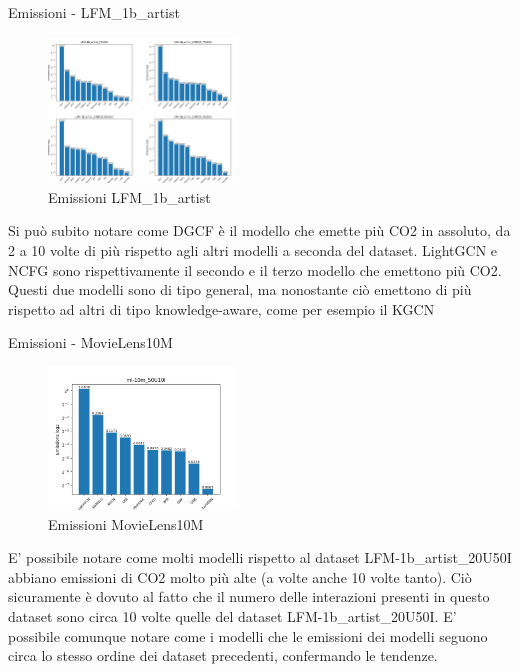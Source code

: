 \begin{frame}{Emissioni - LFM\_1b\_artist}
        \begin{figure}
        \centering
        \includegraphics[width=0.45\textwidth]{images/EmissioniLFM.png}
        \caption{Emissioni LFM\_1b\_artist}
    \end{figure}
    \small
    Si può subito notare come DGCF è il modello che emette più CO2 in assoluto, da 2 a 10 volte di più rispetto agli altri modelli a seconda del dataset.
    LightGCN e NCFG sono rispettivamente il secondo e il terzo modello che emettono più CO2.
    Questi due modelli sono di tipo general, ma nonostante ciò emettono di più rispetto ad altri di tipo knowledge-aware, come per esempio il KGCN
\end{frame}

\begin{frame}{Emissioni - MovieLens10M}
    \begin{figure}
    \centering
    \includegraphics[width=0.45\textwidth]{images/emissions_ml-10m_50U10I.png}
    \caption{Emissioni MovieLens10M}
\end{figure}
\small
E' possibile notare come molti modelli rispetto al dataset LFM-1b\_artist\_20U50I abbiano emissioni di CO2 molto più alte (a volte anche 10 volte tanto).
Ciò sicuramente è dovuto al fatto che il numero delle interazioni presenti in questo dataset sono circa 10 volte quelle del dataset LFM-1b\_artist\_20U50I.
E' possibile comunque notare come i modelli che le emissioni dei modelli seguono circa lo stesso ordine dei dataset precedenti, confermando le tendenze.
\end{frame}


